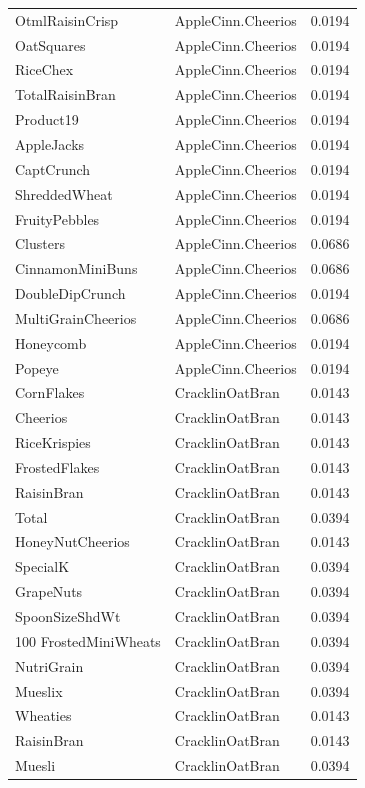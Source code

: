 \begin{longtable}{llr}
OtmlRaisinCrisp & AppleCinn.Cheerios & 0.0194 \\
OatSquares & AppleCinn.Cheerios & 0.0194 \\
RiceChex & AppleCinn.Cheerios & 0.0194 \\
TotalRaisinBran & AppleCinn.Cheerios & 0.0194 \\
Product19 & AppleCinn.Cheerios & 0.0194 \\
AppleJacks & AppleCinn.Cheerios & 0.0194 \\
CaptCrunch & AppleCinn.Cheerios & 0.0194 \\
ShreddedWheat & AppleCinn.Cheerios & 0.0194 \\
FruityPebbles & AppleCinn.Cheerios & 0.0194 \\
Clusters & AppleCinn.Cheerios & 0.0686 \\
CinnamonMiniBuns & AppleCinn.Cheerios & 0.0686 \\
DoubleDipCrunch & AppleCinn.Cheerios & 0.0194 \\
MultiGrainCheerios & AppleCinn.Cheerios & 0.0686 \\
Honeycomb & AppleCinn.Cheerios & 0.0194 \\
Popeye & AppleCinn.Cheerios & 0.0194 \\
CornFlakes & CracklinOatBran & 0.0143 \\
Cheerios & CracklinOatBran & 0.0143 \\
RiceKrispies & CracklinOatBran & 0.0143 \\
FrostedFlakes & CracklinOatBran & 0.0143 \\
RaisinBran & CracklinOatBran & 0.0143 \\
Total & CracklinOatBran & 0.0394 \\
HoneyNutCheerios & CracklinOatBran & 0.0143 \\
SpecialK & CracklinOatBran & 0.0394 \\
GrapeNuts & CracklinOatBran & 0.0394 \\
SpoonSizeShdWt & CracklinOatBran & 0.0394 \\
100%
FrostedMiniWheats & CracklinOatBran & 0.0394 \\
NutriGrain & CracklinOatBran & 0.0394 \\
Mueslix & CracklinOatBran & 0.0394 \\
Wheaties & CracklinOatBran & 0.0143 \\
RaisinBran & CracklinOatBran & 0.0143 \\
Muesli & CracklinOatBran & 0.0394 \\

\end{longtable}
